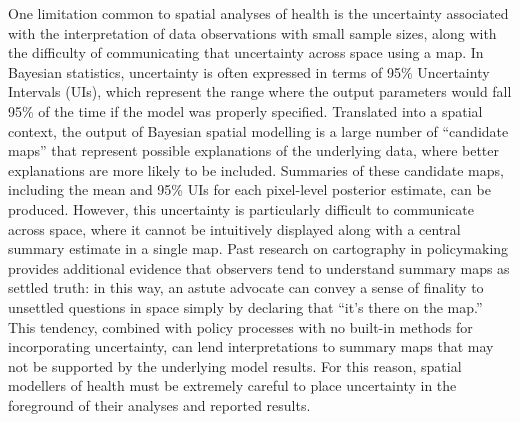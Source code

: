 \documentclass[
]{report}
\begin{document}
One limitation common to spatial analyses of health is the uncertainty associated with the interpretation of data observations with small sample sizes, along with the difficulty of communicating that uncertainty across space using a map. In Bayesian statistics, uncertainty is often expressed in terms of 95\% Uncertainty Intervals (UIs), which represent the range where the output parameters would fall 95\% of the time if the model was properly specified.\autocite{McElreath2016} Translated into a spatial context, the output of Bayesian spatial modelling is a large number of ``candidate maps'' that represent possible explanations of the underlying data, where better explanations are more likely to be included.\autocite{Patil2011} Summaries of these candidate maps, including the mean and 95\% UIs for each pixel-level posterior estimate, can be produced. However, this uncertainty is particularly difficult to communicate across space, where it cannot be intuitively displayed along with a central summary estimate in a single map. Past research on cartography in policymaking provides additional evidence that observers tend to understand summary maps as settled truth: in this way, an astute advocate can convey a sense of finality to unsettled questions in space simply by declaring that ``it's there on the map.\autocite{Elwood2006}'' This tendency, combined with policy processes with no built-in methods for incorporating uncertainty, can lend interpretations to summary maps that may not be supported by the underlying model results. For this reason, spatial modellers of health must be extremely careful to place uncertainty in the foreground of their analyses and reported results.
\end{document}
